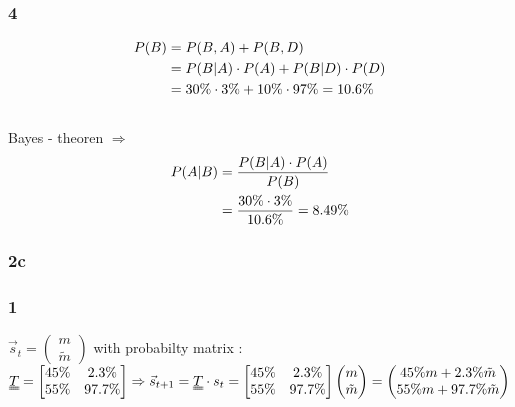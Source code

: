 \documentclass{article}
\begin{document}
\subsubsection*{4}
\begin{equation}\notag
\begin{aligned}
P(B)&=P(B,A) +P(B,D)\\
&=P(B|A)\cdot P(A)+P(B|D)\cdot P(D)\\
&= 30\% \cdot 3\% + 10\% \cdot 97\% = 10.6\%
\end{aligned}
\end{equation}
\\
Bayes - theoren $\Rightarrow$\\
\begin{equation}\notag
\begin{aligned}
P(A|B)&=\frac{P(B|A)\cdot P(A)}{P(B)}\\
&=\frac{30\% \cdot 3\%}{10.6\%} = 8.49\%
\end{aligned}
\end{equation}
\newpage
\subsubsection*{2c}
\subsubsection*{1}
$\vec s_t = 
\begin{pmatrix}
m\\ 
\tilde{m}
\end{pmatrix} $
with probabilty matrix :
$
\uuline{T}= 
\begin{bmatrix}
45\% &2.3\%\\
55\%&97.7\%
\end{bmatrix} 
\\[15pt]
\Rightarrow 
\vec s_{t+1} = \uuline{T}\cdot s_t = 
\begin{bmatrix}
45\% &2.3\%\\
55\%&97.7\%
\end{bmatrix} 
\begin{pmatrix}
m\\ 
\tilde{m}
\end{pmatrix}
=
\begin{pmatrix}
45\%m +2.3\% \tilde{m}\\
55\%m +97.7\% \tilde{m}
\end{pmatrix}
$
\end{document}
